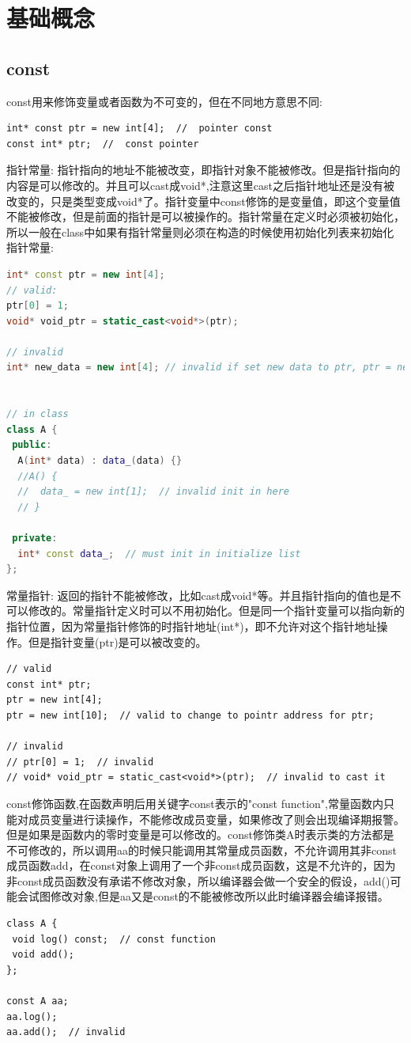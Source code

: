\documentclass[12pt]{book}
\begin{document}
\section{基础概念}
\subsection{const}
const用来修饰变量或者函数为不可变的，但在不同地方意思不同:
\begin{lstlisting}
int* const ptr = new int[4];  //  pointer const
const int* ptr;  //  const pointer
\end{lstlisting}
指针常量: 指针指向的地址不能被改变，即指针对象不能被修改。但是指针指向的内容是可以修改的。并且可以cast成void*,注意这里cast之后指针地址还是没有被改变的，只是类型变成void*了。指针变量中const修饰的是变量值，即这个变量值不能被修改，但是前面的指针是可以被操作的。指针常量在定义时必须被初始化，所以一般在class中如果有指针常量则必须在构造的时候使用初始化列表来初始化指针常量:
\begin{lstlisting}[language=C++]
int* const ptr = new int[4];
// valid:
ptr[0] = 1;
void* void_ptr = static_cast<void*>(ptr);

// invalid
int* new_data = new int[4]; // invalid if set new data to ptr, ptr = new_data;


// in class
class A {
 public:
  A(int* data) : data_(data) {}
  //A() {
  //  data_ = new int[1];  // invalid init in here
  // }
	
 private:
  int* const data_;  // must init in initialize list 
};
\end{lstlisting}
常量指针: 返回的指针不能被修改，比如cast成void*等。并且指针指向的值也是不可以修改的。常量指针定义时可以不用初始化。但是同一个指针变量可以指向新的指针位置，因为常量指针修饰的时指针地址(int*)，即不允许对这个指针地址操作。但是指针变量(ptr)是可以被改变的。
\begin{lstlisting}
// valid
const int* ptr;
ptr = new int[4];
ptr = new int[10];  // valid to change to pointr address for ptr;

// invalid
// ptr[0] = 1;  // invalid
// void* void_ptr = static_cast<void*>(ptr);  // invalid to cast it
\end{lstlisting}

const修饰函数,在函数声明后用关键字const表示的"const function",常量函数内只能对成员变量进行读操作，不能修改成员变量，如果修改了则会出现编译期报警。但是如果是函数内的零时变量是可以修改的。const修饰类A时表示类的方法都是不可修改的，所以调用aa的时候只能调用其常量成员函数，不允许调用其非const成员函数add，在const对象上调用了一个非const成员函数，这是不允许的，因为非const成员函数没有承诺不修改对象，所以编译器会做一个安全的假设，add()可能会试图修改对象,但是aa又是const的不能被修改所以此时编译器会编译报错。
\begin{lstlisting}
class A {
 void log() const;  // const function
 void add();
};

const A aa;
aa.log();
aa.add();  // invalid
\end{lstlisting}
\end{document}
